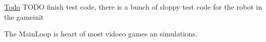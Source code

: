 \begin{Desc}
\item[\hyperlink{todo__todo000010}{Todo}]TODO finish test code, there is a bunch of sloppy test code for the robot in the gameinit \end{Desc}


The MainLoop is heart of most vidoeo games an simulations. 